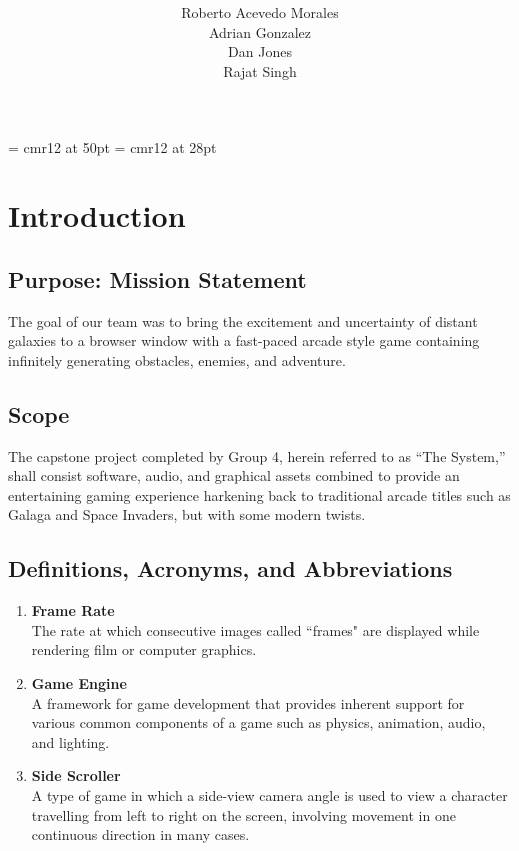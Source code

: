 \documentclass[12pt]{report}
\newenvironment{reqlist}{
	\renewcommand{\labelenumi}{\tab\thesubsection.\arabic{enumi}}
	\renewcommand{\labelenumii}{\thesubsection.\arabic{enumi}.\arabic{enumii}}
	\begin{enumerate}[itemsep = 1pt, parsep = 0pt, leftmargin = *]
}{\end{enumerate}}
\begin{document}

\font\titlefont = cmr12 at 50pt
\font\subtitlefont = cmr12 at 28pt
\title{ \\ \vspace{10pt} }
\author{Roberto Acevedo Morales \\ Adrian Gonzalez \\ Dan Jones \\ Rajat Singh}
\date{}
\maketitle

\tableofcontents \newpage

\section{Introduction}
	\subsection{Purpose: Mission Statement}
		The goal of our team was to bring the excitement and uncertainty of distant galaxies to a browser window with a fast-paced arcade style game containing infinitely generating obstacles, enemies, and adventure.
	\subsection{Scope}
		The capstone project completed by Group 4, herein referred to as ``The System,'' shall consist software, audio, and graphical assets combined to provide an entertaining gaming experience harkening back to traditional arcade titles such as Galaga and Space Invaders, but with some modern twists.
	\subsection{Definitions, Acronyms, and Abbreviations}
		\begin{reqlist}
			\item \textbf{Frame Rate} \\ The rate at which consecutive images called ``frames" are displayed while rendering film or computer graphics.
			\item \textbf{Game Engine} \\ A framework for game development that provides inherent support for various common components of a game such as physics, animation, audio, and lighting.	
			\item \textbf{Side Scroller} \\ A type of game in which a side-view camera angle is used to view a character travelling from left to right on the screen, involving movement in one continuous direction in many cases.
		\end{reqlist}
\end{document}
